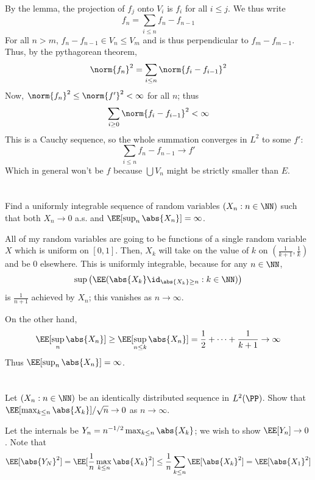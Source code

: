\documentclass[11pt, headheight=30pt]{scrartcl}
\begin{document}
By the lemma, the projection of $f_j$ onto
$V_i$ is $f_i$ for all $i\leq j$. We thus write
\[
    f_n = \sum_{i\leq n} f_n - f_{n-1}    
\]
For all $n > m$, $f_n - f_{n-1}\in V_n\leq V_m$ and is thus perpendicular
to $f_m - f_{m-1}$. Thus, by the pythagorean theorem,
\[
    \norm{f_n}^2 = \sum_{i\leq n} \norm{f_i - f_{i-1}}^2    
\]
Now, $\norm{f_n}^2 \leq \norm{f'}^2 < \infty$ for all $n$;
thus
\[
    \sum_{i\geq 0} \norm{f_i - f_{i-1}}^2 < \infty    
\]
This is a Cauchy sequence, so the whole summation converges
in $L^2$ to some $f'$:
\[
    \sum_{i\leq n} f_n - f_{n-1} \to f'
\]
Which in general won't be $f$ because $\bigcup V_n$ might
be strictly smaller than $E$.

\section{}
\begin{prob*}
    Find a uniformly integrable sequence of random variables $(X_n : n \in \NN)$ such
    that both $X_n \to 0$ a.s. and $\EE[\sup_n \abs{X_n}] = \infty$.
\end{prob*}
All of my random variables are going to be functions of a single
random variable $X$ which is uniform on $[0,1]$. Then, $X_k$
will take on the value of $k$ on $(\frac{1}{k+1}, \frac{1}{k})$
and be $0$ elsewhere. This is uniformly integrable, because
for any $n\in \NN$,
\[
    \sup\left(\EE(\abs{X_k}\id_{\abs{X_k}\geq n}:k\in \NN)\right)
\]
is $\frac{1}{n+1}$ achieved by $X_n$; this vanishes as $n\to \infty$.

On the other hand,
\[
    \EE[\sup_n \abs{X_n}]\geq \EE[\sup_{n\leq k} \abs{X_n}] = \frac12 + \dots + \frac{1}{k+1} \to \infty
\]
Thus $\EE[\sup_n \abs{X_n}] = \infty$.
\section{}
\begin{prob*}
    Let $(X_n : n \in \NN)$ be an identically distributed sequence in $L^2(\PP)$. Show that
    $\EE[\max_{k \le n} \abs{X_k}]/\sqrt{n} \to 0$ as $n \to \infty$.
\end{prob*}

Let the internals be $Y_n = n^{-1/2}\max_{k\leq n} \abs{X_k}$; we wish to show
$\EE[Y_n] \to 0$. Note that
\[
    \EE[\abs{Y_N}^2] = \EE[\frac1n \max_{k\leq n} \abs{X_k}^2] \leq \frac1n \sum_{k\leq n} \EE[\abs{X_k}^2] = \EE[\abs{X_1}^2]
\]
\end{document}
